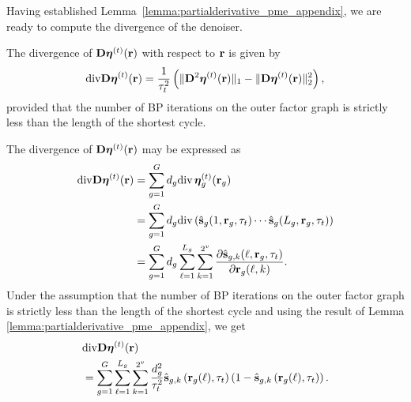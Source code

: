 \documentclass[journal]{IEEEtran}
\begin{document}
Having established Lemma~\ref{lemma:partialderivative_pme_appendix}, we are ready to compute the divergence of the denoiser.  

\begin{proposition}
    \label{proposition:denoiserdivergence_appendix}
    The divergence of $\mathbf{D}\boldsymbol{\eta}^{(t)}(\mathbf{r})$ with respect to $\mathbf{r}$ is given by 
    \begin{equation}
        \mathrm{div} \mathbf{D}\boldsymbol{\eta}^{(t)}(\mathbf{r}) = \frac{1}{\tau_t^2}\left( \| \mathbf{D}^2\boldsymbol{\eta}^{(t)}(\mathbf{r}) \|_1 - \| \mathbf{D}\boldsymbol{\eta}^{(t)}(\mathbf{r}) \|_2^2 \right) ,
    \end{equation}
    provided that the number of BP iterations on the outer factor graph is strictly less than the length of the shortest cycle.
\end{proposition}
\begin{IEEEproof}
The divergence of $\mathbf{D}\boldsymbol{\eta}^{(t)}(\mathbf{r})$ may be expressed as
\begin{equation*}
    \begin{split}
        \mathrm{div}\mathbf{D}\boldsymbol{\eta}^{(t)}(\mathbf{r}) &=
        \sum_{g = 1}^{G} d_{g} \mathrm{div} \hspace{0.5mm} \boldsymbol{\eta}^{(t)}_{g}(\mathbf{r}_{g}) \\
        &=\sum_{g = 1}^{G} d_{g} \mathrm{div} \left( \hat{\mathbf{s}}_g(1, \mathbf{r}_g, \tau_t)\cdots\hat{\mathbf{s}}_g(L_g, \mathbf{r}_g, \tau_t) \right) \\
        &= \sum_{g = 1}^{G} d_{g} \sum_{\ell = 1}^{L_g} \sum_{k = 1}^{2^v} \frac{\partial \hat{\mathbf{s}}_{g, k}(\ell, \mathbf{r}_g, \tau_t)}{\partial \mathbf{r}_g(\ell, k)} .
    \end{split}
\end{equation*}
Under the assumption that the number of BP iterations on the outer factor graph is strictly less than the length of the shortest cycle and using the result of Lemma \ref{lemma:partialderivative_pme_appendix}, we get
    \begin{equation*}
        \begin{split}
            &\mathrm{div}\mathbf{D}\boldsymbol{\eta}^{(t)}(\mathbf{r}) \\
            &= \sum_{g = 1}^{G} \sum_{\ell = 1}^{L_g} \sum_{k = 1}^{2^v} \frac{d_{g}^2}{\tau_t^2} \hat{\mathbf{s}}_{g, k}\left(\mathbf{r}_{g}(\ell), \tau_t \right) \left( 1 - \hat{\mathbf{s}}_{g, k} \left(\mathbf{r}_{g}(\ell), \tau_t \right) \right) .
        \end{split}
    \end{equation*}

\end{IEEEproof}
\end{document}
